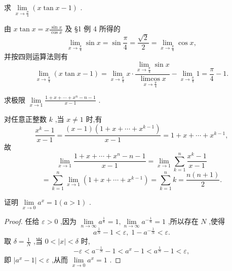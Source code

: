 \begin{example}
求 \(\mathop{\lim }\limits_{{x \rightarrow  \frac{\pi }{4}}}\left( {x\tan x - 1}\right)\) .
\end{example}


\begin{solution}
由 \(x\tan x = x\frac{\sin x}{\cos x}\) 及 §1 例 4 所得的
\[
\mathop{\lim }\limits_{{x \rightarrow  \frac{\pi }{4}}}\sin x = \sin \frac{\pi }{4} = \frac{\sqrt{2}}{2} = \mathop{\lim }\limits_{{x \rightarrow  \frac{\pi }{4}}}\cos x,
\]
并按四则运算法则有
\[
\mathop{\lim }\limits_{{x \rightarrow  \frac{\pi }{4}}}\left( {x\tan x - 1}\right)  = \mathop{\lim }\limits_{{x \rightarrow  \frac{\pi }{4}}}x \cdot  \frac{\mathop{\lim }\limits_{{x \rightarrow  \frac{\pi }{4}}}\sin x}{\mathop{\operatorname{limcos}}\limits_{{x \rightarrow  \frac{\pi }{4}}}x} - \mathop{\lim }\limits_{{x \rightarrow  \frac{\pi }{4}}}1 = \frac{\pi }{4} - 1.
\]
\end{solution}

\begin{example}
求极限 \(\mathop{\lim }\limits_{{x \rightarrow  1}}\frac{1 + x + \cdots  + {x}^{n} - n - 1}{x - 1}\) .
\end{example}


\begin{solution}
对任意正整数 \(k\) ,当 \(x \neq  1\) 时,有
\[
\frac{{x}^{k} - 1}{x - 1} = \frac{\left( {x - 1}\right) \left( {1 + x + \cdots  + {x}^{k - 1}}\right) }{x - 1} = 1 + x + \cdots  + {x}^{k - 1},
\]
故
\[
\mathop{\lim }\limits_{{x \rightarrow  1}}\frac{1 + x + \cdots  + {x}^{n} - n - 1}{x - 1} = \mathop{\lim }\limits_{{x \rightarrow  1}}\mathop{\sum }\limits_{{k = 1}}^{n}\frac{{x}^{k} - 1}{x - 1}
\]
\[
= \mathop{\sum }\limits_{{k = 1}}^{n}\mathop{\lim }\limits_{{x \rightarrow  1}}\left( {1 + x + \cdots  + {x}^{k - 1}}\right)  = \mathop{\sum }\limits_{{k = 1}}^{n}k = \frac{n\left( {n + 1}\right) }{2}.
\]
\end{solution}

\begin{example}
证明 \(\mathop{\lim }\limits_{{x \rightarrow  0}}{a}^{x} = 1\left( {a > 1}\right)\) .
\end{example}


\begin{proof}
任给 \(\varepsilon  > 0\) ,因为 \(\mathop{\lim }\limits_{{n \rightarrow  \infty }}{a}^{\frac{1}{n}} = 1,\mathop{\lim }\limits_{{n \rightarrow  \infty }}{a}^{-\frac{1}{n}} = 1\) ,所以存在 \(N\) ,使得
\[
{a}^{\frac{1}{N}} - 1 < \varepsilon ,\;1 - {a}^{-\frac{1}{N}} < \varepsilon .
\]
取 \(\delta  = \frac{1}{N}\) ,当 \(0 < \left| x\right|  < \delta\) 时,
\[
- \varepsilon  < {a}^{-\frac{1}{N}} - 1 < {a}^{x} - 1 < {a}^{\frac{1}{N}} - 1 < \varepsilon ,
\]
即 \(\left| {{a}^{x} - 1}\right|  < \varepsilon\) ,从而 \(\mathop{\lim }\limits_{{x \rightarrow  0}}{a}^{x} = 1\) .
\end{proof}


